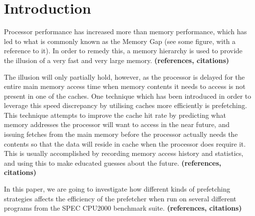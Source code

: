 
\section{Introduction}
\label{sec:introduction}
Processor performance has increased more than memory performance,
which has led to what is commonly known as the Memory Gap (see some
figure, with a reference to it). In order to remedy this, a memory
hierarchy is used to provide the illusion of a very fast and very
large memory. 
{\bf (references, citations)}

The illusion will only partially hold, however, as the processor is
delayed for the entire main memory access time when memory contents it
needs to access is not present in one of the caches. One technique
which has been introduced in order to leverage this speed discrepancy
by utilising caches more efficiently is prefetching. This technique
attempts to improve the cache hit rate by predicting what memory
addresses the processor will want to access in the near future, and
issuing fetches from the main memory before the processor actually
needs the contents so that the data will reside in cache when the
processor does require it. This is usually accomplished by recording
memory access history and statistics, and using this to make educated
guesses about the future. 
{\bf (references, citations)}

In this paper, we are going to investigate how different kinds of
prefetching strategies affects the efficiency of the prefetcher when
run on several different programs from the SPEC CPU2000 benchmark
suite.  {\bf (references, citations)}

